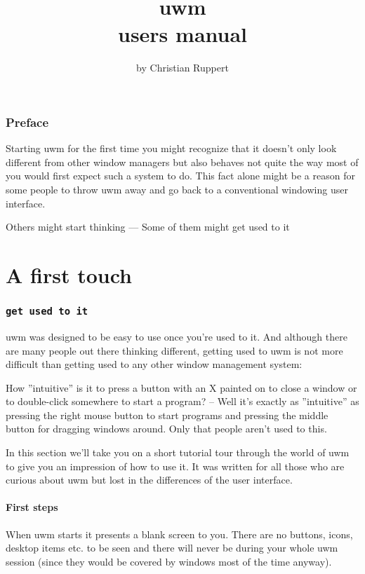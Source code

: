 \documentclass[10pt,a4paper]{article}
\newcommand{\uwm}{{\sc uwm} }
\begin{document}
\begin{titlepage}
\title{{\Huge \uwm}\\ users manual}
\author{by Christian Ruppert}
\maketitle
\vfill
{}
\thispagestyle{empty}
\pagebreak
\end{titlepage}
\tableofcontents
\pagebreak
\section*{Preface}
Starting \uwm for the first time you might recognize that it doesn't only look different from other window managers but also behaves not quite the way most of you would first expect such a system to do. This fact alone might be a reason for some people to throw \uwm away and go back to a conventional windowing user interface.

Others might start thinking \hfill --- \hfill Some of them might \textsf{get used to it}

\part{A first touch}
\section{\texttt{get used to it}}
\uwm was designed to be easy to use once you're used to it. And although there are many people out there thinking different, getting used to \uwm is not more difficult than getting used to  any other window management system:

How ''intuitive'' is it to press a button with an \textsf{X} painted on to close a window or to double-click somewhere to start a program? -- Well it's exactly as ''intuitive'' as pressing the right mouse button to start programs and pressing the middle button for dragging windows around. Only that people aren't used to this.

In this section we'll take you on a short tutorial tour through the world of \uwm to give you an impression of how to use it. It was written for all those who are curious about \uwm but lost in the differences of the user interface.

\subsection{First steps}
When \uwm starts it presents a blank screen to you. There are no buttons, icons, desktop items etc. to be seen and there will never be during your whole \uwm session (since they would be covered by windows most of the time anyway).
\end{document}
